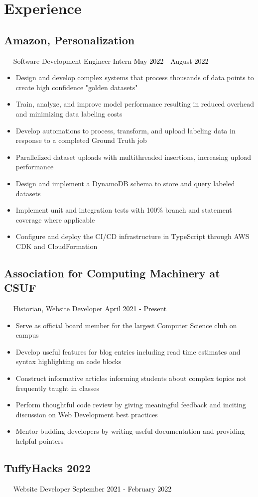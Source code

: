 \documentclass{article}
\newcommand{\resumesection}[3]{
    \subsection*{#1}
    \ 
    \ 
    \small
    \textcolor{csufgrey}{#2}
    \normalsize
    \hfill
    \textcolor{black}{#3}
    \normalsize
}
\begin{document}
\section*{Experience}
\resumesection{Amazon, Personalization}{Software Development Engineer Intern}{May 2022 - August 2022}
\begin{itemize}
    \item Design and develop complex systems that process thousands of data points to create high confidence "golden datasets"
    \item Train, analyze, and improve model performance resulting in reduced overhead and minimizing data labeling costs
    \item Develop automations to process, transform, and upload labeling data in response to a completed Ground Truth job
    \item Parallelized dataset uploads with multithreaded insertions, increasing upload performance
    \item Design and implement a DynamoDB schema to store and query labeled datasets
    \item Implement unit and integration tests with 100\% branch and statement coverage where applicable
    \item Configure and deploy the CI/CD infrastructure in TypeScript through AWS CDK and CloudFormation
\end{itemize}
\resumesection{Association for Computing Machinery at CSUF}{Historian, Website Developer}{April 2021 - Present}
\begin{itemize}
    \item Serve as official board member for the largest Computer Science club on campus
    \item Develop useful features for blog entries including read time estimates and syntax highlighting on code blocks
    \item Construct informative articles informing students about complex topics not frequently taught in classes
    \item Perform thoughtful code review by giving meaningful feedback and inciting discussion on Web Development best practices
    \item Mentor budding developers by writing useful documentation and providing helpful pointers
\end{itemize}
\resumesection{TuffyHacks 2022}{Website Developer}{September 2021 - February 2022}
\end{document}
